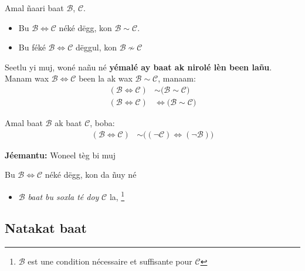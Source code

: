 \documentclass[twoside, a4paper]{article}
\begin{document}
\begin{tcolorbox}[enhanced jigsaw,breakable,pad at break*=1mm,
    colback=yellow!5!white,colframe=white!75!black,title= Seetlu,
    watermark color=white]
  Amal ñaari baat $\mathcal{B}$, $\mathcal{C}$.
  \begin{itemize}
    \item Bu $\mathcal{B}\iff\mathcal{C}$ néké dëgg, kon $\mathcal{B}\sim \mathcal{C}$.
    \item Bu féké $\mathcal{B}\iff\mathcal{C}$ dëggul, kon $\mathcal{B}\not\sim\mathcal{C}$
  \end{itemize}

  Seetlu yi muj, woné nañu né \textbf{yémalé ay baat ak nirolé lèn been lañu}. Manam wax $\mathcal{B}\iff\mathcal{C}$ been la ak wax $\mathcal{B}\sim \mathcal{C}$, manaam:
  \begin{align*}
    (\mathcal{B} \iff \mathcal{C}) & \sim \big( \mathcal{B} \sim \mathcal{C}\big) \\
    (\mathcal{B} \iff \mathcal{C}) & \iff \big( \mathcal{B} \sim \mathcal{C}\big)
  \end{align*}
\end{tcolorbox}
\begin{tcolorbox}[enhanced jigsaw,breakable,pad at break*=1mm, colback=blue!5!white,colframe=white!75!black,title= Tèg\footnote{Proposition},
    watermark color=white]
  Amal baat $\mathcal{B}$ ak baat $\mathcal{C}$, boba:
  \begin{align*}
    (\mathcal{B} \iff \mathcal{C}) & \sim \big( (\neg\mathcal{C}) \iff (\neg \mathcal{B}) \big)
  \end{align*}
\end{tcolorbox}

\textbf{Jéemantu:} Woneel tèg bi muj

\begin{tcolorbox}[enhanced jigsaw,breakable,pad at break*=1mm, colback=red!5!white,colframe=white!75!black,title= Téeki,
    watermark color=white]
  Bu $\mathcal{B} \iff \mathcal{C}$ néké dëgg, kon da ñuy né\\
  \begin{itemize}
    \item $\mathcal{B}$ \textit{baat bu soxla té doy} $\mathcal{C}$ la, \footnote{$\mathcal{B}$ est une condition nécessaire et suffisante pour $\mathcal{C}$}
  \end{itemize}
\end{tcolorbox}

\subsection{Natakat baat}
\end{document}
